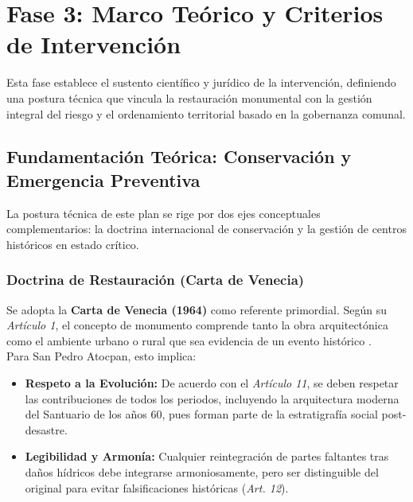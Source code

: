 \section{Fase 3: Marco Teórico y Criterios de Intervención}
\label{sec:marco-teorico}

Esta fase establece el sustento científico y jurídico de la intervención, 
definiendo una postura técnica que vincula la restauración monumental con la 
gestión integral del riesgo y el ordenamiento territorial basado en la 
gobernanza comunal.

\subsection{Fundamentación Teórica: Conservación y Emergencia Preventiva}
\label{ssec:fundamentacion-teorica}

La postura técnica de este plan se rige por dos ejes conceptuales complementarios: 
la doctrina internacional de conservación y la gestión de centros históricos en 
estado crítico.

\subsubsection{Doctrina de Restauración (Carta de Venecia)}
\label{ssec:doctrina-restauracion}

Se adopta la \textbf{Carta de Venecia (1964)} como referente primordial. 
Según su \textit{Artículo 1}, el concepto de monumento comprende tanto la 
obra arquitectónica como el ambiente urbano o rural que sea evidencia de un evento 
histórico \cite{icomos1964venecia}. 
\\
Para San Pedro Atocpan, esto implica:
\begin{itemize}
    \item \textbf{Respeto a la Evolución:} De acuerdo con el \textit{Artículo 11}, 
            se deben respetar las contribuciones de todos los periodos, incluyendo 
            la arquitectura moderna del Santuario de los años 60, pues forman parte 
            de la estratigrafía social post-desastre.
    \item \textbf{Legibilidad y Armonía:} Cualquier reintegración de partes faltantes 
            tras daños hídricos debe integrarse armoniosamente, pero ser distinguible 
            del original para evitar falsificaciones históricas (\textit{Art. 12}).
\end{itemize}

